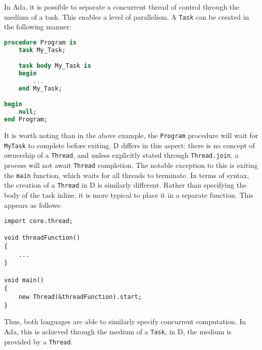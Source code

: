 In Ada, it is possible to separate a concurrent thread of control through the
medium of a task. This enables a level of parallelism. A \texttt{Task} can be 
created in the following manner: 
\begin{lstlisting}[language=Ada]
procedure Program is 
    task My_Task; 

    task body My_Task is 
    begin
        ...
    end My_Task;

begin
    null; 
end Program;
\end{lstlisting}
It is worth noting than in the above example, the \texttt{Program} procedure will wait
for \texttt{My\textunderscore{}Task} to complete before exiting. D differs in this aspect: 
there is no concept of ownership of a \texttt{Thread}, and unless
explicitly stated through \texttt{Thread.join}, a process will not await
\texttt{Thread} completion. The notable exception to this is exiting the
\texttt{main} function, which waits for all threads to terminate. 
In terms of syntax, the creation of a
\texttt{Thread} in D is similarly different. Rather than specifying the body of
the task inline, it is more typical to place it in a separate function. This
appears as follows: 
\begin{lstlisting}
import core.thread; 

void threadFunction()
{
    ...
}

void main()
{
    new Thread(&threadFunction).start;
}
\end{lstlisting}
Thus, both languages are able to similarly specify concurrent computation. In
Ada, this is achieved through the medium of a \texttt{Task}, in D, the medium
is provided by a \texttt{Thread}. 

